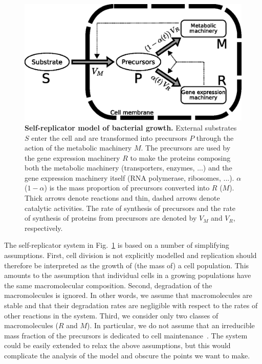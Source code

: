 \begin{figure}[h]
\includegraphics[scale=1]{./Fig/Fig1.eps}
\caption[Self-replicator model of bacterial growth]{
{\bf Self-replicator model of bacterial growth.} External substrates $S$ enter the cell and are transformed into precursors $P$ through the action of the metabolic machinery $M$.
The precursors are used by the gene expression machinery $R$ to make the proteins composing both the metabolic machinery (transporters, enzymes, ...) and the gene expression machinery itself (RNA polymerase, ribosomes, ...).
$\alpha$ ($1-\alpha$) is the mass proportion of precursors converted into $R$ ($M$).
Thick arrows denote reactions and thin, dashed arrows denote catalytic activities.
The rate of synthesis of precursors and the rate of synthesis of proteins from precursors are denoted by $V_M$ and $V_R$, respectively.
}
\label{fig:self_replicator}
\end{figure}

The self-replicator system in Fig.~\ref{fig:self_replicator} is based on a number of simplifying assumptions.
First, cell division is not explicitly modelled and replication should therefore be interpreted as the growth of (the mass of) a cell population.
This amounts to the assumption that individual cells in a growing populations have the same macromolecular composition.
Second, degradation of the macromolecules is ignored.
In other words, we assume that macromolecules are stable and that their degradation rates are negligible with respect to the rates of other reactions in the system.
Third, we consider only two classes of macromolecules ($R$ and $M$).
In particular, we do not assume that an irreducible mass fraction of the precursors is dedicated to cell maintenance~\cite{scott_interdependence_2010}.
The system could be easily extended to relax the above assumptions, but this would complicate the analysis of the model and obscure the points we want to make.

